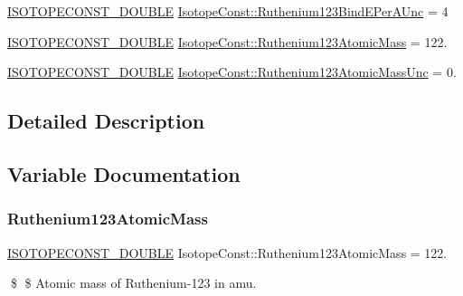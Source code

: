 \begin{DoxyCompactItemize}
\mbox{\hyperlink{group___isotope_const-_macros_ga8f45a7272ce02c0b4c65c44636ed719a}{I\+S\+O\+T\+O\+P\+E\+C\+O\+N\+S\+T\+\_\+\+D\+O\+U\+B\+LE}} \mbox{\hyperlink{group___isotope_const-_ruthenium-_ru123_gab35ff89f9f41b591fa7f7dee749dae56}{Isotope\+Const\+::\+Ruthenium123\+Bind\+E\+Per\+A\+Unc}} = 4
\item 
\mbox{\hyperlink{group___isotope_const-_macros_ga8f45a7272ce02c0b4c65c44636ed719a}{I\+S\+O\+T\+O\+P\+E\+C\+O\+N\+S\+T\+\_\+\+D\+O\+U\+B\+LE}} \mbox{\hyperlink{group___isotope_const-_ruthenium-_ru123_ga5fe188af4a04a5dec71bb61664bf77fa}{Isotope\+Const\+::\+Ruthenium123\+Atomic\+Mass}} = 122.
\item 
\mbox{\hyperlink{group___isotope_const-_macros_ga8f45a7272ce02c0b4c65c44636ed719a}{I\+S\+O\+T\+O\+P\+E\+C\+O\+N\+S\+T\+\_\+\+D\+O\+U\+B\+LE}} \mbox{\hyperlink{group___isotope_const-_ruthenium-_ru123_gabe5d20dcb44b89ad8ba95313da4a04da}{Isotope\+Const\+::\+Ruthenium123\+Atomic\+Mass\+Unc}} = 0.
\end{DoxyCompactItemize}


\subsection{Detailed Description}


\subsection{Variable Documentation}
\mbox{\label{group___isotope_const-_ruthenium-_ru123_ga5fe188af4a04a5dec71bb61664bf77fa}} 
\subsubsection{\texorpdfstring{Ruthenium123\+Atomic\+Mass}{Ruthenium123AtomicMass}}
{\footnotesize\ttfamily \mbox{\hyperlink{group___isotope_const-_macros_ga8f45a7272ce02c0b4c65c44636ed719a}{I\+S\+O\+T\+O\+P\+E\+C\+O\+N\+S\+T\+\_\+\+D\+O\+U\+B\+LE}} Isotope\+Const\+::\+Ruthenium123\+Atomic\+Mass = 122.}

\$ \$ Atomic mass of Ruthenium-\/123 in amu. \mbox{\label{group___isotope_const-_ruthenium-_ru123_gabe5d20dcb44b89ad8ba95313da4a04da}} 

